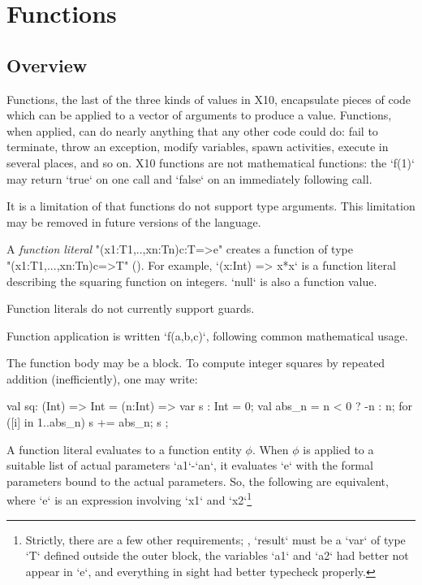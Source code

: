 

\chapter{Functions}
\label{Functions}
\label{functions}
\label{Closures}

\section{Overview}
Functions, the last of the three kinds of values in X10, encapsulate pieces of
code which can be applied to a vector of arguments to produce a value.
Functions, when applied, can do nearly anything that any other code could do:
fail to terminate, throw an exception, modify variables, spawn activities,
execute in several places, and so on. X10 functions are not mathematical
functions: the \xcd`f(1)` may return \xcd`true` on one call and \xcd`false` on
an immediately following call.

It is a limitation of \XtenCurrVer{} that functions do not support
type arguments. This limitation may be removed in future versions of
the language.

A \emph{function literal} \xcd"(x1:T1,..,xn:Tn){c}:T=>e" creates a function of
type\\ \xcd"(x1:T1,...,xn:Tn){c}=>T" ().  For example, 
\xcd`(x:Int) => x*x` is a function literal describing the squaring function on
integers.   
\xcd`null` is also a function value.

\limitationx{} Function literals do not currently support guards. 

Function application is written \xcd`f(a,b,c)`, following common mathematical
usage. 


The function body may be a block.  To compute integer squares by repeated
addition (inefficiently), one may write: 
\begin{xten}
val sq: (Int) => Int 
      = (n:Int) => {
           var s : Int = 0;
           val abs_n = n < 0 ? -n : n;
           for ([i] in 1..abs_n) s += abs_n;
           s
        };
\end{xten}




A function literal evaluates to a function entity {$\phi$}. When {$\phi$} is
applied to a suitable list of actual parameters \xcd`a1`-\xcd`an`, it
evaluates \xcd`e` with the formal parameters bound to the actual parameters.
So, the following are equivalent, where \xcd`e` is an expression involving
\xcd`x1` and \xcd`x2`\footnote{Strictly, there are a few other requirements;
  \eg, \xcd`result` must be a \xcd`var` of type \xcd`T` defined outside the
  outer block, the variables \xcd`a1` and \xcd`a2` had better not appear in
  \xcd`e`, and everything in sight had better typecheck properly.}

